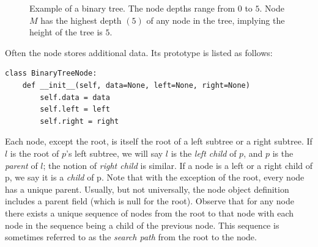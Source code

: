 \documentclass[11pt,a4paper]{article}
\begin{document}
\begin{figure}[hb]
  \centering
  \caption{Example of a binary tree. The node depths range from $0$ to $5$. Node $M$ has the highest depth $(5)$ of any node in the tree, implying the height of the tree is $5$.}
  \label{fig:treeexample}
\end{figure}

Often the node stores additional data. Its prototype is listed as follows:

\begin{verbatim}
class BinaryTreeNode:
    def __init__(self, data=None, left=None, right=None)
        self.data = data
        self.left = left
        self.right = right
\end{verbatim}

Each node, except the root, is itself the root of a left subtree or a right
subtree. If $l$ is the root of $p$'s left subtree, we will say $l$ is the
\textit{left child} of $p$, and $p$ is the \textit{parent} of $l$; the notion of
\textit{right child} is similar. If a node is a left or a right child of p, we
say it is a \textit{child} of p. Note that with the exception of the root, every
node has a unique parent. Usually, but not universally, the node object
definition includes a parent field (which is null for the root). Observe that
for any node there exists a unique sequence of nodes from the root to that node
with each node in the sequence being a child of the previous node. This sequence
is sometimes referred to as the \textit{search path} from the root to the node.
\end{document}
